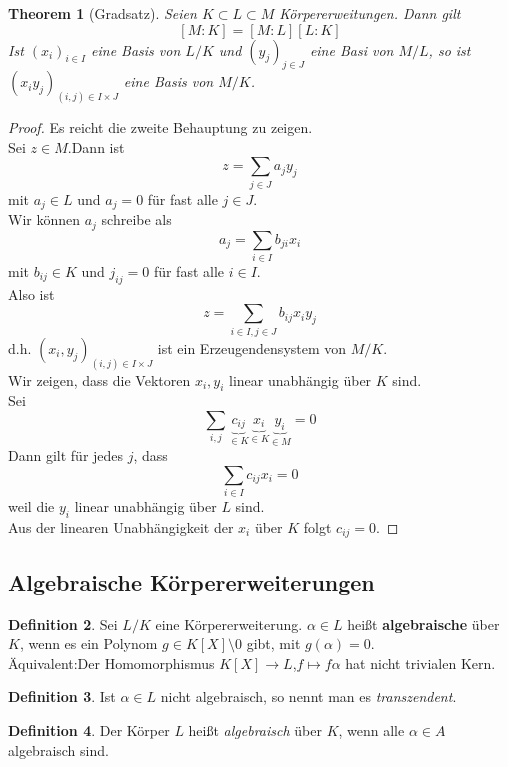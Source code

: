 \documentclass[10pt,a4paper]{article}
\newcommand{\al}{\ensuremath{\alpha}}
\theoremstyle{plain}
\newtheorem{theorem}{Theorem}[section]
\theoremstyle{definition}
\newtheorem{definition}[theorem]{Definition}
\theoremstyle{remark}
\begin{document}
	\begin{theorem}[Gradsatz]
		Seien $K\subset L\subset M$ Körpererweitungen. Dann gilt
		\[[M:K]=[M:L][L:K]\]
		Ist $(x_i)_{i\in I}$ eine Basis von $L/K$ und $(y_j)_{j\in J}$ eine Basi von $M/L$, so ist $(x_iy_j)_{(i,j)\in I\times J}$ eine Basis von $M/K$.
	\end{theorem}
	\begin{proof}
		Es reicht die zweite Behauptung zu zeigen.\\
		Sei $z\in M$.Dann ist
		\[z=\sum_{j\in J}a_jy_j\]
		mit $a_j\in L$ und $a_j=0$ für fast alle $j\in J$.\\
		Wir können $a_j$ schreibe als
		\[a_j=\sum_{i\in I}b_{ji}x_i\]
		mit $b_{ij}\in K$ und $j_{ij}=0$ für fast alle $i\in I$.\\
		Also ist
		\[z=\sum_{i\in I,j\in J}b_{ij}x_iy_j\]
		d.h. $(x_i,y_j)_{(i,j)\in I\times J}$ ist ein Erzeugendensystem von $M/K$.\\
		Wir zeigen, dass die Vektoren $x_i,y_i$ linear unabhängig über $K$ sind.\\
		Sei
		\[\sum_{i,j}\underbrace{c_{ij}}_{\in K}\underbrace{x_i}_{\in K}\underbrace{y_i}_{\in M}=0\]
		Dann gilt für jedes $j$, dass
		\[\sum_{i\in I}c_{ij}x_i=0\]
		weil die $y_i$ linear unabhängig über $L$ sind.\\
		Aus der linearen Unabhängigkeit der $x_i$ über $K$ folgt $c_{ij}=0$.
	\end{proof}

	\subsection{Algebraische Körpererweiterungen}
	\begin{definition}
		Sei $L/K$ eine Körpererweiterung. $\al\in L$ heißt \textbf{algebraische} über $K$, wenn es ein Polynom $g\in K[X]\setminus 0$ gibt, mit $g(\al)=0$.\\
		Äquivalent:Der Homomorphismus $K[X]\to L$,$f\mapsto f\al$ hat nicht trivialen Kern.
	\end{definition}


	\begin{definition}
		Ist $\al\in L$ nicht algebraisch, so nennt man es \emph{transzendent}.
	\end{definition}

	\begin{definition}
		Der Körper $L$ heißt \emph{algebraisch} über $K$, wenn alle $\al\in A$ algebraisch sind.
	\end{definition}
\end{document}
